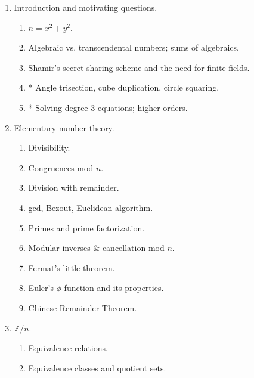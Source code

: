 \documentclass[numbers=enddot,12pt,final,onecolumn,notitlepage]{scrartcl}%
\theoremstyle{definition}
\begin{document}
\begin{enumerate}
\item Introduction and motivating questions.

\begin{enumerate}
\item $n=x^{2}+y^{2}$.

\item Algebraic vs. transcendental numbers; sums of algebraics.

\item \href{https://en.wikipedia.org/wiki/Shamir%27s_Secret_Sharing}{Shamir's
secret sharing scheme} and the need for finite fields.

\item * Angle trisection, cube duplication, circle squaring.

\item * Solving degree-$3$ equations; higher orders.
\end{enumerate}

\item Elementary number theory.

\begin{enumerate}
\item Divisibility.

\item Congruences mod $n$.

\item Division with remainder.

\item gcd, Bezout, Euclidean algorithm.

\item Primes and prime factorization.

\item Modular inverses \& cancellation mod $n$.

\item Fermat's little theorem.

\item Euler's $\phi$-function and its properties.

\item Chinese Remainder Theorem.
\end{enumerate}

\item $\mathbb{Z}/n$.

\begin{enumerate}
\item Equivalence relations.

\item Equivalence classes and quotient sets.


\end{enumerate}
\end{enumerate}
\end{document}
